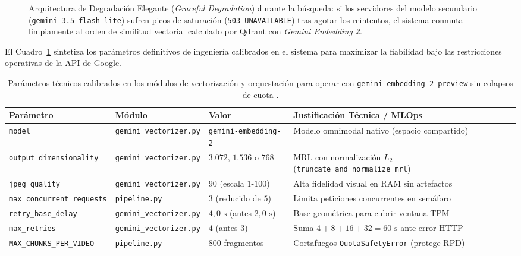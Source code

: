 \begin{figure}[htbp]
\caption{Arquitectura de Degradación Elegante (\textit{Graceful Degradation}) durante la búsqueda: si los servidores del modelo secundario (\texttt{gemini-3.5-flash-lite}) sufren picos de saturación (\texttt{503 UNAVAILABLE}) tras agotar los reintentos, el sistema conmuta limpiamente al orden de similitud vectorial calculado por Qdrant con \textit{Gemini Embedding 2}.} %
\label{fig:degradacion_elegante_503}
\end{figure}

El Cuadro~\ref{tab:parametros_gemini_vectorizer} sintetiza los parámetros definitivos de ingeniería calibrados en el sistema para maximizar la fiabilidad bajo las restricciones operativas de la API de Google. %

\begin{table}[htbp]
\centering
\small
\caption{Parámetros técnicos calibrados en los módulos de vectorización y orquestación para operar con \texttt{gemini-embedding-2-preview} sin colapsos de cuota \cite{gemini_emb2_docs}.} %
\label{tab:parametros_gemini_vectorizer}
\begin{tabularx}{\linewidth}{p{4.2cm}p{3.2cm}p{2.6cm}X}
\toprule
\textbf{Parámetro} & \textbf{Módulo} & \textbf{Valor} & \textbf{Justificación Técnica / MLOps} \\
\midrule
\texttt{model} & \texttt{gemini\_vectorizer.py} & \texttt{gemini-embedding-2} & Modelo omnimodal nativo (espacio compartido) \\
\texttt{output\_dimensionality} & \texttt{gemini\_vectorizer.py} & $3.072$, $1.536$ o $768$ & MRL con normalización $L_2$ (\texttt{truncate\_and\_normalize\_mrl}) \\
\texttt{jpeg\_quality} & \texttt{gemini\_vectorizer.py} & $90$ (escala $1\text{-}100$) & Alta fidelidad visual en RAM sin artefactos \\
\texttt{max\_concurrent\_requests} & \texttt{pipeline.py} & $3$ (reducido de $5$) & Limita peticiones concurrentes en semáforo \\
\texttt{retry\_base\_delay} & \texttt{gemini\_vectorizer.py} & $4,0\text{ s}$ (antes $2,0\text{ s}$) & Base geométrica para cubrir ventana TPM \\
\texttt{max\_retries} & \texttt{gemini\_vectorizer.py} & $4$ (antes $3$) & Suma $4+8+16+32 = 60\text{ s}$ ante error HTTP \\
\texttt{MAX\_CHUNKS\_PER\_VIDEO} & \texttt{pipeline.py} & $800$ fragmentos & Cortafuegos \texttt{QuotaSafetyError} (protege RPD) \\
\bottomrule
\end{tabularx}
\end{table}